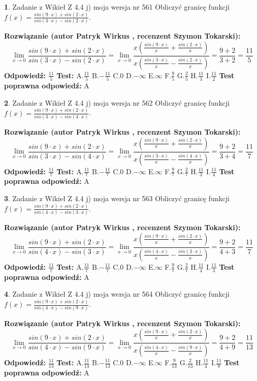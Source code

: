 \documentclass[12pt, a4paper]{article}
\theoremstyle{definition} %
\newtheorem{zad}{}
\newcommand{\zadStart}[1]{\begin{zad}#1\newline}
\newcommand{\zadStop}{\end{zad}}
\newcommand{\rozwStart}[2]{\noindent \textbf{Rozwiązanie (autor #1 , recenzent #2): }\newline}
\newcommand{\rozwStop}{\newline}
\newcommand{\odpStart}{\noindent \textbf{Odpowiedź:}\newline}
\newcommand{\odpStop}{\newline}
\newcommand{\testStart}{\noindent \textbf{Test:}\newline}
\newcommand{\testStop}{\newline}
\newcommand{\kluczStart}{\noindent \textbf{Test poprawna odpowiedź:}\newline}
\newcommand{\kluczStop}{\newline}
\begin{document}
\zadStart{Zadanie z Wikieł Z 4.4 j) moja wersja nr 561}
Obliczyć granicę funkcji $f(x)=\frac{sin(9\cdot x) +sin(2\cdot x)}{sin(3\cdot x) -sin(2\cdot x)}$.
\zadStop
\rozwStart{Patryk Wirkus}{Szymon Tokarski}
$$\lim\limits_{x\to 0}\frac{sin(9\cdot x) +sin(2\cdot x)}{sin(3\cdot x) -sin(2\cdot x)}=\lim\limits_{x\to 0}\frac{x(\frac{sin(9\cdot x)}{x}+\frac{sin(2\cdot x)}{x})}{x(\frac{sin(3\cdot x)}{x}-\frac{sin(2\cdot x)}{x})}=\frac{9+2}{3+2} = \frac{11}{5}$$
\rozwStop
\odpStart
$\frac{11}{5}$
\odpStop
\testStart
A.$\frac{11}{5}$
B.$-\frac{11}{5}$
C.$0$
D.$-\infty$
E.$\infty$
F.$\frac{9}{5}$
G.$\frac{2}{5}$
H.$\frac{11}{3}$
I.$\frac{11}{2}$
\testStop
\kluczStart
A
\kluczStop



\zadStart{Zadanie z Wikieł Z 4.4 j) moja wersja nr 562}
Obliczyć granicę funkcji $f(x)=\frac{sin(9\cdot x) +sin(2\cdot x)}{sin(3\cdot x) -sin(4\cdot x)}$.
\zadStop
\rozwStart{Patryk Wirkus}{Szymon Tokarski}
$$\lim\limits_{x\to 0}\frac{sin(9\cdot x) +sin(2\cdot x)}{sin(3\cdot x) -sin(4\cdot x)}=\lim\limits_{x\to 0}\frac{x(\frac{sin(9\cdot x)}{x}+\frac{sin(2\cdot x)}{x})}{x(\frac{sin(3\cdot x)}{x}-\frac{sin(4\cdot x)}{x})}=\frac{9+2}{3+4} = \frac{11}{7}$$
\rozwStop
\odpStart
$\frac{11}{7}$
\odpStop
\testStart
A.$\frac{11}{7}$
B.$-\frac{11}{7}$
C.$0$
D.$-\infty$
E.$\infty$
F.$\frac{9}{7}$
G.$\frac{2}{7}$
H.$\frac{11}{3}$
I.$\frac{11}{4}$
\testStop
\kluczStart
A
\kluczStop



\zadStart{Zadanie z Wikieł Z 4.4 j) moja wersja nr 563}
Obliczyć granicę funkcji $f(x)=\frac{sin(9\cdot x) +sin(2\cdot x)}{sin(4\cdot x) -sin(3\cdot x)}$.
\zadStop
\rozwStart{Patryk Wirkus}{Szymon Tokarski}
$$\lim\limits_{x\to 0}\frac{sin(9\cdot x) +sin(2\cdot x)}{sin(4\cdot x) -sin(3\cdot x)}=\lim\limits_{x\to 0}\frac{x(\frac{sin(9\cdot x)}{x}+\frac{sin(2\cdot x)}{x})}{x(\frac{sin(4\cdot x)}{x}-\frac{sin(3\cdot x)}{x})}=\frac{9+2}{4+3} = \frac{11}{7}$$
\rozwStop
\odpStart
$\frac{11}{7}$
\odpStop
\testStart
A.$\frac{11}{7}$
B.$-\frac{11}{7}$
C.$0$
D.$-\infty$
E.$\infty$
F.$\frac{9}{7}$
G.$\frac{2}{7}$
H.$\frac{11}{4}$
I.$\frac{11}{3}$
\testStop
\kluczStart
A
\kluczStop



\zadStart{Zadanie z Wikieł Z 4.4 j) moja wersja nr 564}
Obliczyć granicę funkcji $f(x)=\frac{sin(9\cdot x) +sin(2\cdot x)}{sin(4\cdot x) -sin(9\cdot x)}$.
\zadStop
\rozwStart{Patryk Wirkus}{Szymon Tokarski}
$$\lim\limits_{x\to 0}\frac{sin(9\cdot x) +sin(2\cdot x)}{sin(4\cdot x) -sin(9\cdot x)}=\lim\limits_{x\to 0}\frac{x(\frac{sin(9\cdot x)}{x}+\frac{sin(2\cdot x)}{x})}{x(\frac{sin(4\cdot x)}{x}-\frac{sin(9\cdot x)}{x})}=\frac{9+2}{4+9} = \frac{11}{13}$$
\rozwStop
\odpStart
$\frac{11}{13}$
\odpStop
\testStart
A.$\frac{11}{13}$
B.$-\frac{11}{13}$
C.$0$
D.$-\infty$
E.$\infty$
F.$\frac{9}{13}$
G.$\frac{2}{13}$
H.$\frac{11}{4}$
I.$\frac{11}{9}$
\testStop
\kluczStart
A
\kluczStop
\end{document}
